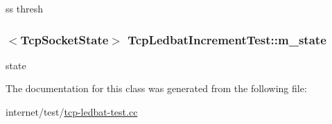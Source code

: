 ss thresh 

\subsubsection[{\texorpdfstring{m\+\_\+state}{m_state}}]{$<${\bf Tcp\+Socket\+State}$>$ Tcp\+Ledbat\+Increment\+Test\+::m\+\_\+state\hspace{0.3cm}{\ttfamily [private]}}\hypertarget{classTcpLedbatIncrementTest_ac357e24b111ad8cad0098877e8beb98e}{}\label{classTcpLedbatIncrementTest_ac357e24b111ad8cad0098877e8beb98e}


state 



The documentation for this class was generated from the following file\+:\begin{DoxyCompactItemize}
\item 
internet/test/\hyperlink{tcp-ledbat-test_8cc}{tcp-\/ledbat-\/test.\+cc}\end{DoxyCompactItemize}
